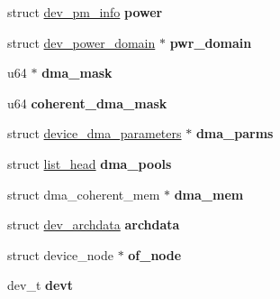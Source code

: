 \begin{DoxyCompactItemize}
\item 
\hypertarget{structdevice_aeb021c3dc747d9a1f0ad5f151a875a59}{}struct \hyperlink{structdev__pm__info}{dev\+\_\+pm\+\_\+info} {\bfseries power}\label{structdevice_aeb021c3dc747d9a1f0ad5f151a875a59}

\item 
\hypertarget{structdevice_a262161d7f6c8815e8eec84a85b05639e}{}struct \hyperlink{structdev__power__domain}{dev\+\_\+power\+\_\+domain} $\ast$ {\bfseries pwr\+\_\+domain}\label{structdevice_a262161d7f6c8815e8eec84a85b05639e}

\item 
\hypertarget{structdevice_a92a44eae354c4e4248ac21a1a5862bcc}{}u64 $\ast$ {\bfseries dma\+\_\+mask}\label{structdevice_a92a44eae354c4e4248ac21a1a5862bcc}

\item 
\hypertarget{structdevice_a5b9c5899df169407bf943a7b3ec5ef31}{}u64 {\bfseries coherent\+\_\+dma\+\_\+mask}\label{structdevice_a5b9c5899df169407bf943a7b3ec5ef31}

\item 
\hypertarget{structdevice_a2f4a2cfa77096dd552ef0cf0973734dd}{}struct \hyperlink{structdevice__dma__parameters}{device\+\_\+dma\+\_\+parameters} $\ast$ {\bfseries dma\+\_\+parms}\label{structdevice_a2f4a2cfa77096dd552ef0cf0973734dd}

\item 
\hypertarget{structdevice_a5d9daf14f099c030e1f466468918fe0d}{}struct \hyperlink{structlist__head}{list\+\_\+head} {\bfseries dma\+\_\+pools}\label{structdevice_a5d9daf14f099c030e1f466468918fe0d}

\item 
\hypertarget{structdevice_ad06ce842f26164a1c2f73811b1b6af99}{}struct dma\+\_\+coherent\+\_\+mem $\ast$ {\bfseries dma\+\_\+mem}\label{structdevice_ad06ce842f26164a1c2f73811b1b6af99}

\item 
\hypertarget{structdevice_a61e07f819c3bee7438c30b30a9580da0}{}struct \hyperlink{structdev__archdata}{dev\+\_\+archdata} {\bfseries archdata}\label{structdevice_a61e07f819c3bee7438c30b30a9580da0}

\item 
\hypertarget{structdevice_a6f19b9b69a0e2a69c51b352ff9adac2d}{}struct device\+\_\+node $\ast$ {\bfseries of\+\_\+node}\label{structdevice_a6f19b9b69a0e2a69c51b352ff9adac2d}

\item 
\hypertarget{structdevice_ad5cf4aca7f5c1a224b903ede41c15e5a}{}dev\+\_\+t {\bfseries devt}\label{structdevice_ad5cf4aca7f5c1a224b903ede41c15e5a}


\end{DoxyCompactItemize}

